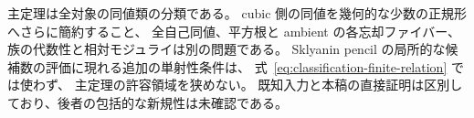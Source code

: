 \begin{remark}[分類の範囲]
主定理は全対象の同値類の分類である。
cubic 側の同値を幾何的な少数の正規形へさらに簡約すること、
全自己同値、平方根と ambient の各忘却ファイバー、
族の代数性と相対モジュライは別の問題である。
Sklyanin pencil の局所的な候補数の評価に現れる追加の単射性条件は、
式~\eqref{eq:classification-finite-relation} では使わず、
主定理の許容領域を狭めない。
既知入力と本稿の直接証明は区別しており、後者の包括的な新規性は未確認である。
\end{remark}
